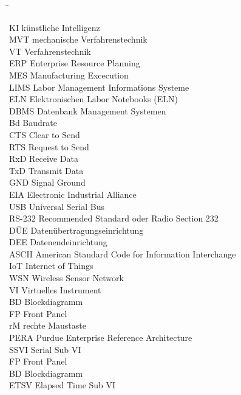 \documentclass[
fontsize=12pt, 
paper=a4, 
BCOR=10mm, 
twoside=false,
 DIV=10, 
 headsepline, 
 footsepline
 ]{scrartcl}
\begin{document}
\begin{large}
\begin{tabbing}
\hspace{90pt}\=\hspace{200pt}\=\kill

KI \> künstliche Intelligenz \\ [6pt]
MVT \> mechanische Verfahrenstechnik \\
VT \> Verfahrenstechnik \\
ERP \> Enterprise Resource Planning \\
MES \> Manufacturing Excecution \\
LIMS \> Labor Management Informations Systeme  \\
ELN \> Elektronischen Labor Notebooks (ELN) \\
DBMS \> Datenbank Management Systemen \\
Bd \> Baudrate \\
CTS \> Clear to Send \\
RTS \> Request to Send \\
RxD \> Receive Data \\
TxD \> Transmit Data \\
GND \> Signal Ground \\
EIA \> Electronic Industrial Alliance \\
USB \> Universal Serial Bus \\
RS-232 \> Recommended Standard oder Radio Section 232 \\
DÜE \> Datenübertragungseinrichtung \\
DEE \> Datenendeinrichtung \\
ASCII \> American Standard Code for Information Interchange \\
IoT \> Internet of Things \\
WSN \> Wireless Sensor Network \\
VI \> Virtuelles Instrument \\
BD \> Blockdiagramm \\
FP \> Front Panel \\
rM \> rechte Maustaste \\
PERA \> Purdue Enterprise Reference Architecture \\
SSVI \> Serial Sub VI \\
FP \> Front Panel \\
BD \> Blockdiagramm \\
ETSV \> Elapsed Time Sub VI \\ 


\end{tabbing} 
\end{large}
\end{document}

